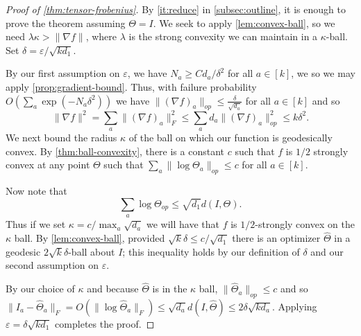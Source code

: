 \documentclass{article}
\newcommand\eps{\varepsilon}
\newcommand\samp{x}
\newcommand{\CF}[1]{{\color{purple}[CF: #1]}}
\begin{document}
\begin{proof}[Proof of \cref{thm:tensor-frobenius}]By \cref{it:reduce} in \cref{subsec:outline}, it is enough to prove the theorem assuming $\Theta = I$.
We seek to apply \cref{lem:convex-ball}, so we need $\lambda \kappa > \|\nabla f\|$, where $\lambda$ is the strong convexity we can maintain in a $\kappa$-ball. Set $\delta = \eps/\sqrt{k d_1}$. 

 By our first assumption on $\eps$, we have $N_a \geq C d_a/\delta^2$ for all $a \in [k]$, we so we may apply \cref{prop:gradient-bound}. Thus, with failure probability $O\left( \sum_a \exp ( - N_a \delta^2)\right)$ we have $\|(\nabla f)_{a}\|_{op} \leq \frac{\delta}{\sqrt{d_{a}}}$ for all $a \in [k]$ and so
\[  \|\nabla f\|^{2} = \sum_{a} \|(\nabla f)_{a}\|_{F}^{2} \leq \sum_{a} d_a \|(\nabla f)_{a}\|_{op}^{2} \leq  k \delta^{2}.  \]
We next bound the radius $\kappa$ of the ball on which our function is geodesically convex. 
By \cref{thm:ball-convexity}, there is a constant $c$ such that $f$ is $1/2$ strongly convex at any point $\Theta$ such that $\sum_a \|\log \Theta_a\|_{op} \leq  c$ for all $a \in [k]$. 


Now note that 
$$ \sum_a \log \Theta_{op} \leq \sqrt{d_1} d(I, \Theta).$$ Thus if we set $\kappa = c/\max_a \sqrt{d_a}$ we will have that $f$ is $1/2$-strongly convex on the $\kappa$ ball. By \cref{lem:convex-ball}, provided $\sqrt{k} \delta \leq c/\sqrt{d_1} $ there is an optimizer $\widehat{\Theta}$ in a geodesic $2 \sqrt{k} \delta$-ball about $I$; this inequality holds by our definition of $\delta$ and our second assumption on $\eps$. 

By our choice of $\kappa$ and because $\widehat{\Theta}$ is in the $\kappa$ ball, $\|\widehat{\Theta}_a\|_{op} \leq c$ and so $\|I_a - \widehat{\Theta}_a\|_F = O( \| \log \widehat{\Theta}_a\|_F) \leq \sqrt{d_a} d(I, \widehat{\Theta}) \leq 2\delta \sqrt{ k d_a}.$ Applying $\eps = \delta \sqrt{k d_1}$ completes the proof.\end{proof}
\end{document}
